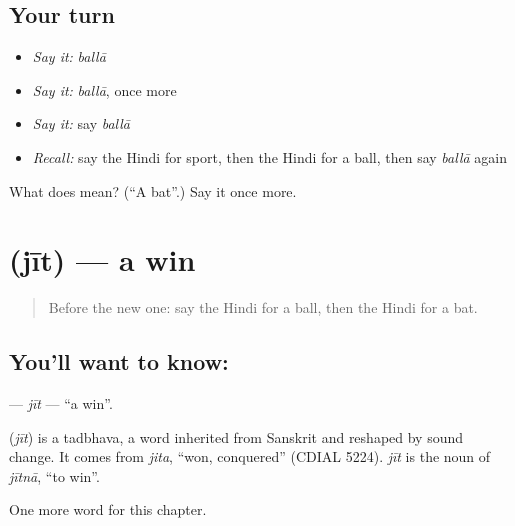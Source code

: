 \subsection*{Your turn}
\begin{itemize}
\raggedright
  \item \emph{Say it:} \emph{ballā}
  \item \emph{Say it:} \emph{ballā}, once more
  \item \emph{Say it:} say \emph{ballā}
  \item \emph{Recall:} say the Hindi for sport, then the Hindi for a ball, then say \emph{ballā} again
\end{itemize}

\begin{tcolorbox}[breakable,colback=teal!4,colframe=teal!35!black,title={Before you move on}]
What does  mean? (\textquotedblleft{}A bat\textquotedblright{}.) Say it once more.
\end{tcolorbox}
\section[\texorpdfstring{\hi{जीत} (jīt)}{जीत (jīt)}]{ (jīt) — a win}

\label{lesson:HI-C224-jit}



\begin{quote}
Before the new one: say the Hindi for a ball, then the Hindi for a bat.
\end{quote}

\subsection*{You'll want to know: }
\textbf{} — \emph{jīt} — \textquotedblleft{}a win\textquotedblright{}.

\begin{cousinweb}
\textbf{} (\emph{jīt}) is a tadbhava, a word inherited from Sanskrit and reshaped by sound change. It comes from \emph{jita}, \textquotedblleft{}won, conquered\textquotedblright{} (CDIAL 5224). \emph{jīt} is the noun of \emph{jītnā}, \textquotedblleft{}to win\textquotedblright{}.
\end{cousinweb}

\begin{grammarlens}[title={What you've built}]
One more word for this chapter.
\end{grammarlens}


